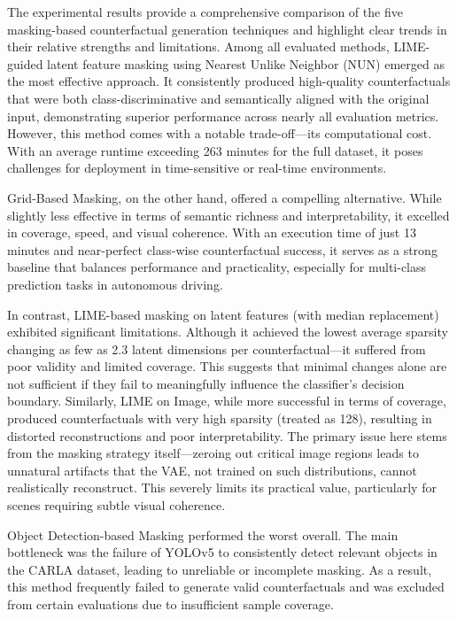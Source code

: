 The experimental results provide a comprehensive comparison of the five masking-based counterfactual generation techniques and highlight clear trends in their relative strengths and limitations. Among all evaluated methods, LIME-guided latent feature masking using Nearest Unlike Neighbor (NUN) emerged as the most effective approach. It consistently produced high-quality counterfactuals that were both class-discriminative and semantically aligned with the original input, demonstrating superior performance across nearly all evaluation metrics. However, this method comes with a notable trade-off—its computational cost. With an average runtime exceeding 263 minutes for the full dataset, it poses challenges for deployment in time-sensitive or real-time environments.

Grid-Based Masking, on the other hand, offered a compelling alternative. While slightly less effective in terms of semantic richness and interpretability, it excelled in coverage, speed, and visual coherence. With an execution time of just 13 minutes and near-perfect class-wise counterfactual success, it serves as a strong baseline that balances performance and practicality, especially for multi-class prediction tasks in autonomous driving.

In contrast, LIME-based masking on latent features (with median replacement) exhibited significant limitations. Although it achieved the lowest average sparsity changing as few as 2.3 latent dimensions per counterfactual—it suffered from poor validity and limited coverage. This suggests that minimal changes alone are not sufficient if they fail to meaningfully influence the classifier's decision boundary. Similarly, LIME on Image, while more successful in terms of coverage, produced counterfactuals with very high sparsity (treated as 128), resulting in distorted reconstructions and poor interpretability. The primary issue here stems from the masking strategy itself—zeroing out critical image regions leads to unnatural artifacts that the VAE, not trained on such distributions, cannot realistically reconstruct. This severely limits its practical value, particularly for scenes requiring subtle visual coherence.

Object Detection-based Masking performed the worst overall. The main bottleneck was the failure of YOLOv5 to consistently detect relevant objects in the CARLA dataset, leading to unreliable or incomplete masking. As a result, this method frequently failed to generate valid counterfactuals and was excluded from certain evaluations due to insufficient sample coverage.


